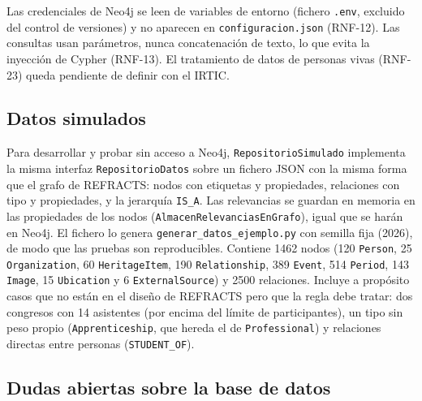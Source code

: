 
Las credenciales de Neo4j se leen de variables de entorno (fichero \texttt{.env}, excluido del control de versiones) y no aparecen en \texttt{configuracion.json} (RNF-12). Las consultas usan parámetros, nunca concatenación de texto, lo que evita la inyección de Cypher (RNF-13). El tratamiento de datos de personas vivas (RNF-23) queda pendiente de definir con el IRTIC. 

\subsection{Datos simulados}

Para desarrollar y probar sin acceso a Neo4j, \texttt{RepositorioSimulado} implementa la misma interfaz \texttt{RepositorioDatos} sobre un fichero JSON con la misma forma que el grafo de REFRACTS: nodos con etiquetas y propiedades, relaciones con tipo y propiedades, y la jerarquía \texttt{IS\_A}. Las relevancias se guardan en memoria en las propiedades de los nodos (\texttt{AlmacenRelevanciasEnGrafo}), igual que se harán en Neo4j. El fichero lo genera \texttt{generar\_datos\_ejemplo.py} con semilla fija (2026), de modo que las pruebas son reproducibles. Contiene 1462 nodos (120 \texttt{Person}, 25 \texttt{Organization}, 60 \texttt{HeritageItem}, 190 \texttt{Relationship}, 389 \texttt{Event}, 514 \texttt{Period}, 143 \texttt{Image}, 15 \texttt{Ubication} y 6 \texttt{ExternalSource}) y 2500 relaciones. Incluye a propósito casos que no están en el diseño de REFRACTS pero que la regla debe tratar: dos congresos con 14 asistentes (por encima del límite de participantes), un tipo sin peso propio (\texttt{Apprenticeship}, que hereda el de \texttt{Professional}) y relaciones directas entre personas (\texttt{STUDENT\_OF}).

\subsection{Dudas abiertas sobre la base de datos}
\label{sec:bd-dudas}

